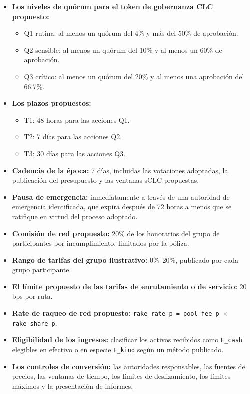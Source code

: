 \documentclass[11pt]{article}
\begin{document}
\begin{itemize}[leftmargin=*]
\item \textbf{Los niveles de quórum para el token de gobernanza CLC propuesto:}
\begin{itemize}[leftmargin=*]
\item Q1 rutina: al menos un quórum del 4\% y más del 50\% de aprobación.
\item Q2 sensible: al menos un quórum del 10\% y al menos un 60\% de aprobación.
\item Q3 crítico: al menos un quórum del 20\% y al menos una aprobación del 66.7\%.
\end{itemize}
\item \textbf{Los plazos propuestos:}
\begin{itemize}[leftmargin=*]
\item T1: 48 horas para las acciones Q1.
\item T2: 7 días para las acciones Q2.
\item T3: 30 días para las acciones Q3.
\end{itemize}
\item \textbf{Cadencia de la época:} 7 días, incluidas las votaciones adoptadas, la publicación del presupuesto y las ventanas sCLC propuestas.
\item \textbf{Pausa de emergencia:} inmediatamente a través de una autoridad de emergencia identificada, que expira después de 72 horas a menos que se ratifique en virtud del proceso adoptado.
\item \textbf{Comisión de red propuesto:} 20\% de los honorarios del grupo de participantes por incumplimiento, limitados por la póliza.
\item \textbf{Rango de tarifas del grupo ilustrativo:} 0\%--20\%, publicado por cada grupo participante.
\item \textbf{El límite propuesto de las tarifas de enrutamiento o de servicio:} 20 bps por ruta.
\item \textbf{Rate de raqueo de red propuesto:} \texttt{rake\_rate\_p = pool\_fee\_p $\times$ rake\_share\_p}.
\item \textbf{Eligibilidad de los ingresos:} clasificar los activos recibidos como \texttt{E\_cash} elegibles en efectivo o en especie \texttt{E\_kind} según un método publicado.
\item \textbf{Los controles de conversión:} las autoridades responsables, las fuentes de precios, las ventanas de tiempo, los límites de deslizamiento, los límites máximos y la presentación de informes.

\end{itemize}
\end{document}
